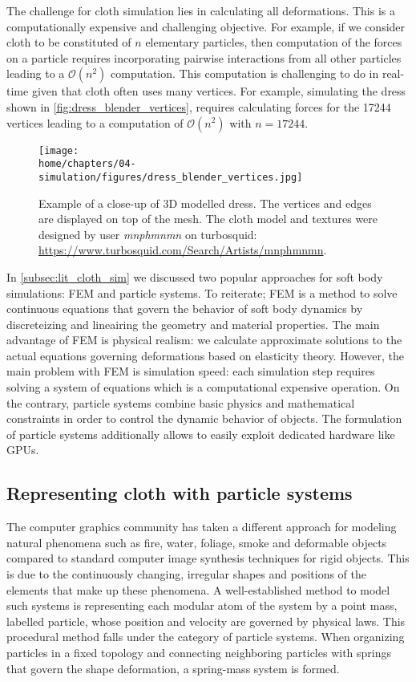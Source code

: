 \documentclass[\home/main.tex]{subfiles}
\begin{document}
The challenge for cloth simulation lies in calculating all deformations. This is a computationally expensive and challenging objective. For example, if we consider cloth to be constituted of $n$ elementary particles, then computation of the forces on a particle requires incorporating pairwise interactions from all other particles leading to a $\mathcal{O}(n^2)$ computation. This computation is challenging to do in real-time given that cloth often uses many vertices. For example, simulating the dress shown in \cref{fig:dress_blender_vertices}, requires calculating forces for the 17244 vertices leading to a computation of $\mathcal{O}(n^2)$ with $n=17244$. 
\begin{figure}
    \centering
    \texttt{[image: \\home/chapters/04-simulation/figures/dress\_blender\_vertices.jpg]}
    \caption[Example of a 3D modelled dress]{Example of a close-up of 3D modelled dress. The vertices and edges are displayed on top of the mesh. The cloth model and textures were designed by user \textit{mnphmnmn} on turbosquid: \url{https://www.turbosquid.com/Search/Artists/mnphmnmn}.}
\end{figure}

In \cref{subsec:lit_cloth_sim} we discussed two popular approaches for soft body simulations: \gls{FEM} and particle systems. To reiterate; \gls{FEM} is a method to solve continuous equations that govern the behavior of soft body dynamics by discreteizing and lineairing the geometry and material properties. The main advantage of \gls{FEM} is physical realism: we calculate approximate solutions to the actual equations governing deformations based on elasticity theory. However, the main problem with \gls{FEM} is simulation speed: each simulation step requires solving a system of equations which is a computational expensive operation. On the contrary, particle systems combine basic physics and mathematical constraints in order to control the dynamic behavior of objects. The formulation of particle systems additionally allows to easily exploit dedicated hardware like \glspl{GPU}. 

\subsection{Representing cloth with particle systems}
The computer graphics community has taken a different approach for modeling natural phenomena such as fire, water, foliage, smoke and deformable objects compared to standard computer image synthesis techniques for rigid objects. This is due to the continuously changing, irregular shapes and positions of the elements that make up these phenomena. A well-established method to model such systems is representing each modular atom of the system by a point mass, labelled particle, whose position and velocity are governed by physical laws. This procedural method falls under the category of particle systems. When organizing particles in a fixed topology and connecting neighboring particles with springs that govern the shape deformation, a spring-mass system is formed. 
\end{document}

